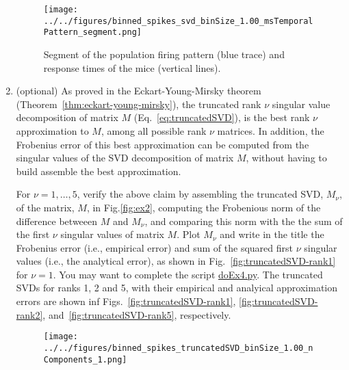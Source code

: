 \documentclass[12pt]{article}
\begin{document}
\begin{enumerate}
            \begin{figure}
                \begin{center}
                    \texttt{[image: ../../figures/binned\_spikes\_svd\_binSize\_1.00\_msTemporalPattern\_segment.png]}
                    \caption{Segment of the population firing pattern (blue
                    trace) and response times of the mice (vertical lines).}
                \end{center}
                \label{fig:populationFiringPattern}
            \end{figure}

        \item (optional) As proved in the Eckart-Young-Mirsky theorem
            (Theorem~\ref{thm:eckart-young-mirsky}), the truncated rank $\nu$
            singular value decomposition of matrix $M$
            (Eq.~\ref{eq:truncatedSVD}), is the best rank $\nu$
            approximation to $M$, among all possible rank $\nu$ matrices. In
            addition, the Frobenius error of this best approximation can be
            computed from the singular values of the SVD decomposition of
            matrix $M$, without having to build assemble the best
            approximation.

            For $\nu=1,\ldots,5$, verify the above claim by assembling the
            truncated SVD, $M_\nu$, of the matrix, $M$, in Fig.\ref{fig:ex2}, computing the
            Frobenious norm of the difference betweeen $M$ and $M_\nu$, and
            comparing this norm with the the sum of the first $\nu$ singular
            values of matrix $M$. Plot $M_\nu$ and write in the title the
            Frobenius error (i.e., empirical error) and sum of the squared
            first $\nu$
            singular values (i.e., the analytical error), as shown in
            Fig.~\ref{fig:truncatedSVD-rank1} for $\nu=1$.
            You may want to complete the
            script
            \href{https://github.com/joacorapela/statNeuro2025/blob/master/worksheets/04_dimensionalityReduction/doEx4.py}{doEx4.py}.
            The truncated SVDs for ranks 1, 2 and 5, with their empirical and
            analyical approximation errors are shown inf
            Figs.~\ref{fig:truncatedSVD-rank1}, \ref{fig:truncatedSVD-rank2},
            and~\ref{fig:truncatedSVD-rank5}, respectively.

            \begin{figure}
                \begin{center}
                    \texttt{[image: ../../figures/binned\_spikes\_truncatedSVD\_binSize\_1.00\_nComponents\_1.png]}


\end{center}
\end{figure}
\end{enumerate}
\end{document}
